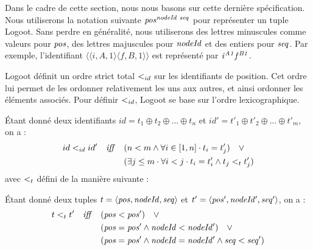 Dans le cadre de cette section, nous nous basons sur cette dernière spécification.
Nous utiliserons la notation suivante $\mathit{pos}^{\mathit{nodeId~seq}}_{\mathit{}}$ pour représenter un tuple Logoot.
Sans perdre en généralité, nous utiliserons des lettres minuscules comme valeurs pour $\mathit{pos}$, des lettres majuscules pour $\mathit{nodeId}$ et des entiers pour $\mathit{seq}$.
Par exemple, l'identifiant $\langle \langle i,A,1 \rangle \langle f,B,1 \rangle \rangle$ est représenté par $\mathit{i}^{\mathit{A1}}_{\mathit{}}\mathit{f}^{\mathit{B1}}_{\mathit{}}$.

Logoot définit un ordre strict total $<_{id}$ sur les identifiants de position.
Cet ordre lui permet de les ordonner relativement les uns aux autres, et ainsi ordonner les éléments associés.
Pour définir $<_{id}$, Logoot se base sur l'ordre lexicographique.
\begin{definition}
  Étant donné deux identifiants $id = t_1 \oplus t_2 \oplus ... \oplus t_n$ et $id' = t'_1 \oplus t'_2 \oplus ... \oplus t'_m$, on a :
  \begin{equation*}
    \begin{split}
      id <_{id} id' \quad \mathit{iff} \quad     & (n < m \land \forall i \in [1,n] \cdot t_i = t'_j) \quad \lor \\
                                            & (\exists j \leq m \cdot \forall i < j \cdot t_i = t'_i \land t_j <_{t} t'_j) \\
    \end{split}
  \end{equation*}
  avec $<_{t}$ défini de la manière suivante :
  \begin{subdefinition}
    Étant donné deux tuples $t = \langle \mathit{pos},\mathit{nodeId},\mathit{seq} \rangle$ et $t' = \langle \mathit{pos'},\mathit{nodeId'},\mathit{seq'} \rangle$, on a :
    \begin{equation*}
      \begin{split}
        t <_{t} t' \quad \mathit{iff} \quad  & (\mathit{pos} < \mathit{pos}') \quad \lor \\
                                            & (\mathit{pos} = \mathit{pos'} \land \mathit{nodeId} < \mathit{nodeId'}) \quad \lor \\
                                            & (\mathit{pos} = \mathit{pos'} \land \mathit{nodeId} = \mathit{nodeId'} \land \mathit{seq} < \mathit{seq'}) \\
      \end{split}
    \end{equation*}
  \end{subdefinition}
\end{definition}

